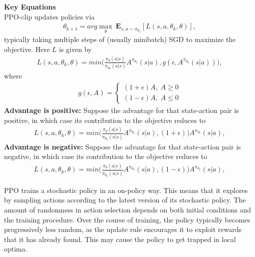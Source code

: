 \documentclass[12pt,a4paper,oneside]{book}
\theoremstyle{plain}
\numberwithin{equation}{chapter} \DeclareMathOperator{\Var}{Var}
\begin{document}
\textbf{Key Equations} \\
PPO-clip updates policies via
\begin{align*}
    \theta_{k+1}=arg\max_\theta{\ \mathbf{E}_{s,a\sim\pi_{\theta_k}}}\left[L\left(s,a,\theta_k,\theta\right)\right],
\end{align*}
typically taking multiple steps of (usually minibatch) SGD to maximize the objective. Here $L$ is given by
\begin{align*}
    L\left(s,a,\theta_k,\theta\right)=min \Big(\frac{\pi_{\theta}(a|s)}{\pi_{\theta_k}(a|s)}A^{\pi_{\theta_k}}(s|a),g(\epsilon,A^{\pi_{\theta_k}}(s|a)) \Big) ,
\end{align*}
where 
\begin{align*}
    g(\epsilon,A)=\left\{
    \begin{aligned}
        (1+\epsilon)A,\; A\geq 0  \\
        (1-\epsilon)A,\; A\leq 0   
    \end{aligned}
\right.
\end{align*}
\textbf{Advantage is positive: }Suppose the advantage for that state-action pair is positive, in which case its contribution to the objective reduces to
\begin{align*}
    L\left(s,a,\theta_k,\theta\right)=min\Big(\frac{\pi_{\theta}(a|s)}{\pi_{\theta_k}(a|s)}A^{\pi_{\theta_k}}(s|a),(1+\epsilon)\Big)A^{\pi_{\theta_k}}(s|a) ,
\end{align*}
\textbf{Advantage is negative:} Suppose the advantage for that state-action pair is negative, in which case its contribution to the objective reduces to
\begin{align*}
    L\left(s,a,\theta_k,\theta\right)=min \Big(\frac{\pi_{\theta}(a|s)}{\pi_{\theta_k}(a|s)}A^{\pi_{\theta_k}}(s|a),(1-\epsilon)\Big)A^{\pi_{\theta_k}}(s|a) ,
\end{align*}

PPO trains a stochastic policy in an on-policy way. This means that it explores by sampling actions according to the latest version of its stochastic policy. The amount of randomness in action selection depends on both initial conditions and the training procedure. Over the course of training, the policy typically becomes progressively less random, as the update rule encourages it to exploit rewards that it has already found. This may cause the policy to get trapped in local optima.
\end{document}
